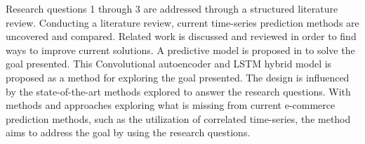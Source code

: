 Research questions 1 through 3 are addressed through a structured literature review.
Conducting a literature review, current time-series prediction methods are uncovered and compared.
Related work is discussed and reviewed in order to find ways to improve current solutions.
A predictive model is proposed in  to solve the goal presented.
This Convolutional autoencoder and LSTM hybrid model is proposed as a method for exploring the goal presented.
The design is influenced by the state-of-the-art methods explored to answer the research questions.
With methods and approaches exploring what is missing from current e-commerce prediction methods,
such as the utilization of correlated time-series, the method aims to address the goal by using the research questions.
\fi
